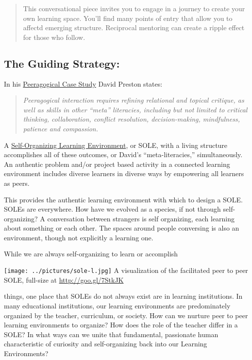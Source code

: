 \begin{quote}
This conversational piece invites you to engage in a journey to create
your own learning space. You'll find many points of entry that allow you
to affectd emerging structure. Reciprocal mentoring can create a ripple
effect for those who follow.
\end{quote}

\subsection{The Guiding Strategy:}\label{the-guiding-strategy}

In his \href{http://peeragogy.org/case-study-5ph1nx/}{Peeragogical Case
Study} David Preston states:

\begin{quote}
\emph{Peeragogical interaction requires refining relational and topical
critique, as well as skills in other ``meta'' literacies, including but
not limited to critical thinking, collaboration, conflict resolution,
decision-making, mindfulness, patience and compassion.}
\end{quote}

A
\href{http://en.wikipedia.org/wiki/Self_Organised_Learning_Environment}{Self-Organizing
Learning Environment}, or SOLE, with a living structure accomplishes all
of these outcomes, or David's ``meta-literacies,'' simultaneously. An
authentic problem and/or project based activity in a connected learning
environment includes diverse learners in diverse ways by empowering all
learners as peers.

This provides the authentic learning environment with which to design a
SOLE. SOLEs are everywhere. How have we evolved as a species, if not
through self-organizing? A conversation between strangers is self
organizing, each learning about something or each other. The spaces
around people conversing is also an environment, though not explicitly a
learning one. 

While we are always self-organizing to learn or accomplish

\clearpage
\begin{vplace}[0.5]
\noindent \texttt{[image: ../pictures/sole-l.jpg]}
A visualization of the facilitated peer to peer SOLE, full-size
at \url{http://goo.gl/7StkJK}
\end{vplace}
\clearpage

\noindent things, one place that SOLEs do not always exist are in
learning institutions. In many educational institutions, our learning
environments are predominately organized by the teacher, curriculum,
or society. How can we nurture peer to peer learning environments to
organize? How does the role of the teacher differ in a SOLE? In what
ways can we unite that fundamental, passionate human characteristic of
curiosity and self-organizing back into our Learning Environments?

